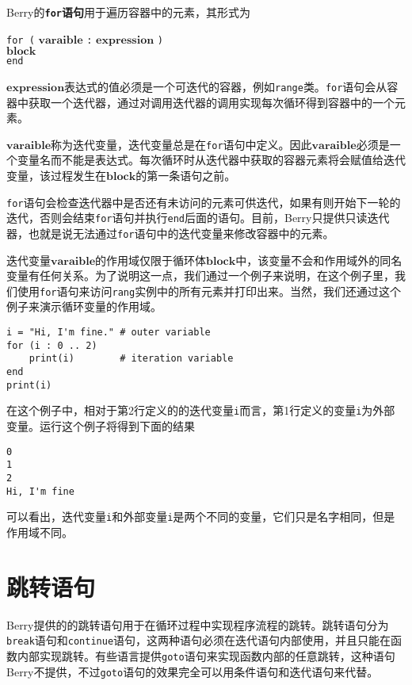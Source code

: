Berry的\textbf{\texttt{for}语句}用于遍历容器中的元素，其形式为
\begin{algorithm}
    \texttt{for (} $\bm{varaible}$ \texttt{:} $\bm{expression}$ \texttt{)} \\
        \qquad $\bm{block}$ \\
    \texttt{end}
\end{algorithm}

$\bm{expression}$表达式的值必须是一个可迭代的容器，例如\texttt{range}类。\texttt{for}语句会从容器中获取一个迭代器，通过对调用迭代器的调用实现每次循环得到容器中的一个元素。

$\bm{varaible}$称为迭代变量，迭代变量总是在\texttt{for}语句中定义。因此$\bm{varaible}$必须是一个变量名而不能是表达式。每次循环时从迭代器中获取的容器元素将会赋值给迭代变量，该过程发生在$\bm{block}$的第一条语句之前。

\texttt{for}语句会检查迭代器中是否还有未访问的元素可供迭代，如果有则开始下一轮的迭代，否则会结束\texttt{for}语句并执行\texttt{end}后面的语句。目前，Berry只提供只读迭代器，也就是说无法通过\texttt{for}语句中的迭代变量来修改容器中的元素。

迭代变量$\bm{varaible}$的作用域仅限于循环体$\bm{block}$中，该变量不会和作用域外的同名变量有任何关系。为了说明这一点，我们通过一个例子来说明，在这个例子里，我们使用\texttt{for}语句来访问\texttt{rang}实例中的所有元素并打印出来。当然，我们还通过这个例子来演示循环变量的作用域。
\begin{lstlisting}[language=berry]
i = "Hi, I'm fine." # outer variable
for (i : 0 .. 2)
    print(i)        # iteration variable
end
print(i)
\end{lstlisting}

在这个例子中，相对于第2行定义的的迭代变量\texttt{i}而言，第1行定义的变量\texttt{i}为外部变量。运行这个例子将得到下面的结果
\begin{lstlisting}[numbers=none]
0
1
2
Hi, I'm fine
\end{lstlisting}
可以看出，迭代变量\texttt{i}和外部变量\texttt{i}是两个不同的变量，它们只是名字相同，但是作用域不同。

\section{跳转语句}

Berry提供的的跳转语句用于在循环过程中实现程序流程的跳转。跳转语句分为\texttt{break}语句和\texttt{continue}语句，这两种语句必须在迭代语句内部使用，并且只能在函数内部实现跳转。有些语言提供\texttt{goto}语句来实现函数内部的任意跳转，这种语句Berry不提供，不过\texttt{goto}语句的效果完全可以用条件语句和迭代语句来代替。

